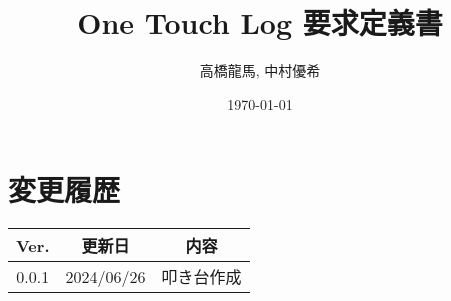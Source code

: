 \documentclass[a4paper,10pt,titlepage]{jreport}
\begin{document}
\title{One Touch Log 要求定義書}
\author{高橋龍馬, 中村優希}
\date{\today}
\maketitle

\section*{変更履歴}

\begin{longtable}[c]{|c|c|c|}
    \hline
        Ver. & 更新日 & 内容 \\
    \hline
    \endfirsthead
    \hline
        0.0.1 & 2024/06/26 & 叩き台作成 \\
    \hline
\end{longtable}

\newpage

\tableofcontents
\clearpage


\end{document}

